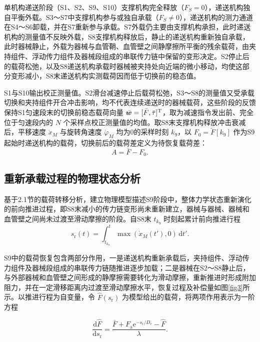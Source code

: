 \documentclass{JQR_LaTeX_Template-0507/JQRnewSubmission}
\begin{document}
单机构递送阶段（S1、S2、S9、S10）支撑机构完全释放（$F_S=0$），递送机构独自平衡外载。S3～S7中支撑机构参与或独自承载（$F_S\neq0$），递送机构的测力通道在S4～S6卸载，并在S7重新参与承载。S7外载仍主要由支撑机构承担，此时递送机构的测量值不反映外载，S8支撑机构释放后，静止的递送机构重新独自承载，此时器械静止，外载为器械与血管鞘、血管壁之间静摩擦所平衡的残余载荷，由夹持组件、浮动传力组件及器械段组成的串联传力链中保留的变形决定。S2停止后的载荷松弛，以及S8递送机构承载时器械被夹持处向近端的微小移动，均使这部分变形减小，S8末递送机构实测载荷因而低于切换前的稳态值。

S1与S10输出校正测量值。S2滑台减速停止后载荷松弛，S3～S8的测量值又受承载切换和夹持组件开合冲击影响，均不代表连续递送时的器械载荷，这些阶段的反馈保持S1匀速段末的切换前稳态载荷向量 $\bar{\bm w}=[\bar F,\bar\tau]^{\rm T}$，取为减速指令发出前、完全位于匀速段内的 $N$ 个采样点校正测量值的均值。取S8末支撑机构释放冲击衰减后，平移速度 $\dot x_M$ 与旋转角速度 $\dot\varphi_M$ 均为0的采样时刻 $k_9$，以 $F_0=\tilde F[k_9]$ 作为S9起始时递送机构的载荷，切换前后的载荷差定义为待恢复载荷差：
\begin{equation}
	\label{eq:deficit}
	A=\bar F-F_0.
\end{equation}


\subsection{重新承载过程的物理状态分析}

基于2.1节的载荷转移分析，建立物理模型描述S9阶段中，整体力学状态重新演化的前向推进过程，即S8末减小的传力链变形尚未重新建立，器械与器械、器械和血管壁之间尚未过渡至滑动摩擦的阶段。自S8末 $t_{k_9}$ 时刻起累计前向推进行程
\begin{equation}
\label{eq:recovery-travel}
s_{\mathrm r}(t)=\int_{t_{k_9}}^{t}
\max\!\left(\dot x_M(t'),0\right)\,\mathrm dt'.
\end{equation}


S9中的载荷恢复包含两部分作用，一是递送机构重新承载后，夹持组件、浮动传力组件及器械段组成的串联传力链随推进逐步加载；二是器械在S2～S8静止后，与外部器械和血管壁之间形成的静摩擦需要转化为滑动摩擦，重新推进时形成附加阻力，并在一定滑移距离内过渡至滑动摩擦水平，恢复过程及补偿量如图\ref{fig3}所示。以推进行程为自变量，令 $\hat F(s_{\mathrm r})$ 为模型给出的载荷，将两项作用表示为一阶方程

\begin{equation}
\label{eq:recovery-ode}
\frac{\mathrm d\hat F}{\mathrm ds_{\mathrm r}}
=\frac{\bar F+F_{\mathrm a}\mathrm e^{-s_{\mathrm r}/D_c}-\hat F}{\lambda}.
\end{equation}
\end{document}
